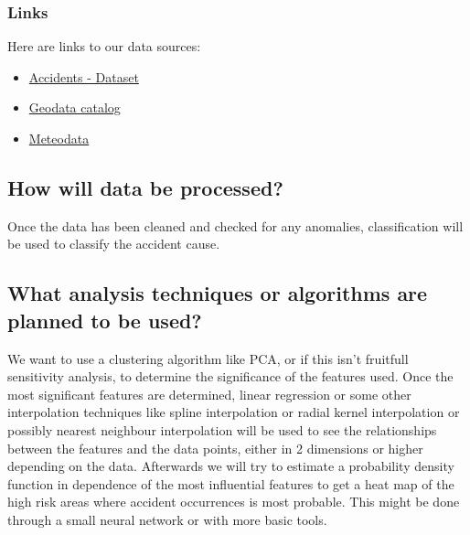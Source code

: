 \documentclass{article}
\begin{document}
\subsubsection{Links}
Here are links to our data sources:
\begin{itemize}
    \item \href{https://opendata.swiss/de/dataset/polizeilich-registrierte-verkehrsunfalle-auf-dem-stadtgebiet-zurich-seit-2011/resource/3bf3f12a-bf09-4e69-8cde-0df9e268d54b}{Accidents - Dataset}
    \item \href{https://maps.zh.ch/}{Geodata catalog}
    \item \href{https://data.stadt-zuerich.ch/dataset/ugz_meteodaten_stundenmittelwerte}{Meteodata}


\end{itemize}

\subsection{How will data be processed?}
Once the data has been cleaned and checked for any anomalies, classification will be used to classify the accident cause.

\subsection{What analysis techniques or algorithms are planned to be used?}
We want to use a clustering algorithm like PCA, or if this isn't fruitfull sensitivity analysis, to determine the significance of the features used. Once the most significant features are determined, linear regression or some other interpolation techniques like spline interpolation or radial kernel interpolation or possibly nearest neighbour interpolation will be used to see the relationships between the features and the data points, either in 2 dimensions or higher depending on the data. Afterwards we will try to estimate a probability density function in dependence of the most influential features to get a heat map of the high risk areas where accident occurrences is most probable. This might be done through a small neural network or with more basic tools.
\end{document}

